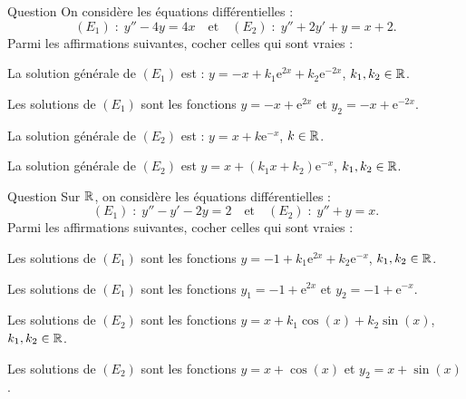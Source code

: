 \begin{multi}[multiple,feedback=
{Les solutions de l'équation caractéristique associée à \((E_1)\) sont \(\pm 2\) et \(y_0=-x\) est une solution particulière de \((E_1)\). Donc la solution générale de \((E_1)\) est :
\[y=-x+k_1\mathrm{e}^{2x}+k_2\mathrm{e}^{-2x},\quad k_1,k_2\in \Rr.\]
L'équation caractéristique associée à \((E_2)\) admet \(-1\) comme racine double et \(y_0=x\) est une solution particulière de \((E_2)\). Donc la solution générale de \((E_2)\) est :
\[y=x+(k_1x+k_2)\mathrm{e}^{-x},\quad k_1,k_2\in \Rr.\]
}]{Question}
On considère les équations différentielles :
\[(E_1)\; :\; y''-4y=4x\quad \mbox{et}\quad (E_2)\; :\; y''+2y'+y=x+2.\]
Parmi les affirmations suivantes, cocher celles qui sont vraies :

    \item* La solution générale de \((E_1)\) est : \(\displaystyle y=-x+k_1\mathrm{e}^{2x}+k_2\mathrm{e}^{-2x}\), \(k_1,k_2\in \mathbb{R}\).
    \item Les solutions de \((E_1)\) sont les fonctions \(\displaystyle y=-x+\mathrm{e}^{2x}\) et \(y_2=-x+\mathrm{e}^{-2x}\).
    \item La solution générale de \((E_2)\) est : \(\displaystyle y=x+k\mathrm{e}^{-x}\), \(k\in \mathbb{R}\).
    \item* La solution générale de \((E_2)\) est \(\displaystyle y=x+(k_1x+k_2)\mathrm{e}^{-x}\), \(k_1,k_2\in \mathbb{R}\).
\end{multi}


\begin{multi}[multiple,feedback=
{Les solutions de l'équation caractéristique associée à \((E_1)\) sont \(2\) et \(-1\) et \(y_0=-1\) est une solution particulière de \((E_1)\). Donc la solution générale de \((E_1)\) est
\[y=-1+k_1\mathrm{e}^{2x}+k_2\mathrm{e}^{-x},\quad k_1,k_2\in \Rr.\]
Les solutions de l'équation caractéristique associée à \((E_2)\) sont \(\pm \mathrm{i}\) et \(y_0=x\) est une solution particulière de \((E_2)\). Donc la solution générale de \((E_2)\) est
\[y=x+k_1\cos (x)+k_2\sin (x),\quad k_1,k_2\in \Rr.\]
}]{Question}
Sur \(\mathbb{R}\), on considère les équations différentielles :
\[(E_1)\; :\; y''-y'-2y=2\quad \mbox{et}\quad (E_2)\; :\; y''+y=x.\]
Parmi les affirmations suivantes, cocher celles qui sont vraies :

    \item* Les solutions de \((E_1)\) sont les fonctions \(\displaystyle y=-1+k_1\mathrm{e}^{2x}+k_2\mathrm{e}^{-x}\), \(k_1,k_2\in \mathbb{R}\).
    \item Les solutions de \((E_1)\) sont les fonctions \(\displaystyle y_1=-1+\mathrm{e}^{2x}\) et \(y_2=-1+\mathrm{e}^{-x}\).
    \item* Les solutions de \((E_2)\) sont les fonctions \(\displaystyle y=x+k_1\cos (x)+k_2\sin (x)\), \(k_1,k_2\in \mathbb{R}\).
    \item Les solutions de \((E_2)\) sont les fonctions \(\displaystyle y=x+\cos (x)\) et \(y_2=x+\sin (x)\).
\end{multi}


